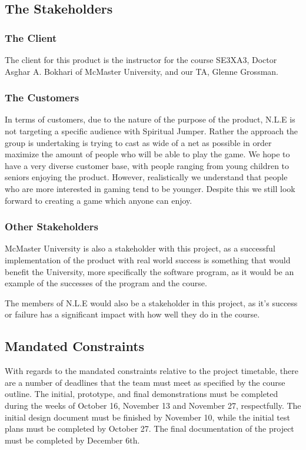 \documentclass[12pt, titlepage]{article}
\begin{document}
\subsection{The Stakeholders}

\subsubsection{The Client}

The client for this product is the instructor for the course SE3XA3, Doctor Asghar A. Bokhari of McMaster University, and our TA, Glenne Grossman.

\subsubsection{The Customers}

In terms of customers, due to the nature of the purpose of the product, N.L.E is not targeting a specific audience with Spiritual Jumper. Rather the approach the group is undertaking is trying to cast as wide of a net as possible in order maximize the amount of people who will be able to play the game. We hope to have a very diverse customer base, with people ranging from young children to seniors enjoying the product. However, realistically we understand that people who are more interested in gaming tend to be younger. Despite this we still look forward to creating a game which anyone can enjoy. 

\subsubsection{Other Stakeholders}

McMaster University is also a stakeholder with this project, as a successful implementation of the product with real world success is something that would benefit the University, more specifically the software program, as it would be an example of the successes of the program and the course. 

The members of N.L.E would also be a stakeholder in this project, as it's success or failure has a significant impact with how well they do in the course. 

\subsection{Mandated Constraints}

With regards to the mandated constraints relative to the project timetable, there are a number of deadlines that the team must meet as specified by the course outline. The initial, prototype, and final demonstrations must be completed during the weeks of October 16, November 13 and November 27, respectfully. The initial design document must be finished by November 10, while the initial test plans must be completed by October 27. The final documentation of the project must be completed by December 6th. 
\end{document}

